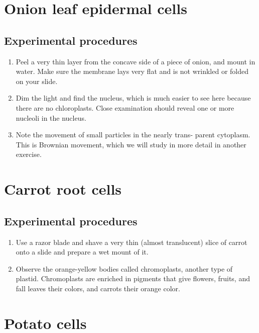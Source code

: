 \section{Onion leaf epidermal cells}\label{onion-leaf-epidermal-cells}

\subsection{Experimental procedures}\label{experimental-procedures-8}

\begin{enumerate}
\def\labelenumi{\arabic{enumi}.}
\tightlist
\item
  Peel a very thin layer from the concave side of a piece of onion, and
  mount in water. Make sure the membrane lays very flat and is not
  wrinkled or folded on your slide.
\item
  Dim the light and find the nucleus, which is much easier to see here
  because there are no chloroplasts. Close examination should reveal one
  or more nucleoli in the nucleus.
\item
  Note the movement of small particles in the nearly trans- parent
  cytoplasm. This is Brownian movement, which we will study in more
  detail in another exercise.
\end{enumerate}

\section{Carrot root cells}\label{carrot-root-cells}

\subsection{Experimental procedures}\label{experimental-procedures-9}

\begin{enumerate}
\def\labelenumi{\arabic{enumi}.}
\tightlist
\item
  Use a razor blade and shave a very thin (almost translucent) slice of
  carrot onto a slide and prepare a wet mount of it.
\item
  Observe the orange-yellow bodies called chromoplasts, another type of
  plastid. Chromoplasts are enriched in pigments that give flowers,
  fruits, and fall leaves their colors, and carrots their orange color.
\end{enumerate}

\section{Potato cells}\label{potato-cells}

